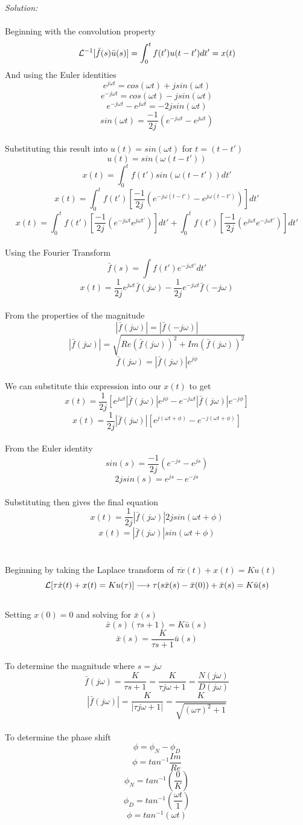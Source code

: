 \documentclass[10pt]{article}
\begin{document}
{\em Solution:}   
\\
\\
Beginning with the convolution property
\[{\cal L}^{-1}[{\bar f}(s){\bar u}(s)]= \int^t_0 f(t')u(t-t')dt' = x(t) \]
And using the Euler identities
\[e^{j \omega t}=cos(\omega t)+j sin(\omega t) \]
\[e^{-j \omega t}=cos(\omega t)-j sin(\omega t) \]
\[e^{-j \omega t}-e^{j \omega t}=-2jsin(\omega t) \]
\[sin(\omega t)=\frac{-1}{2j}(e^{-j\omega t}-e^{j \omega t}) \]
\\
Substituting this result into $u(t)=sin(\omega t)$ for $t=(t-t')$
\[u(t)=sin(\omega(t-t')) \]
\[x(t)=\int^t_0 f(t')sin(\omega(t-t')) dt' \]
\[x(t)=\int^t_0 f(t')\left[ \frac{-1}{2j}(e^{-j \omega(t-t')}-e^{j \omega (t-t')} ) \right] dt' \]
\[x(t)= 
\int^t_0 f(t')\left[ \frac{-1}{2j}(e^{-j \omega t}e^{j \omega t'} )\right]dt' + 
\int^t_0 f(t')\left[ \frac{-1}{2j}(e^{j \omega t}e^{-j \omega  t'} )\right]dt' \]
\\
Using the Fourier Transform
\[{\bar f}(s)=\int f(t')e^{-j \omega t'}dt' \]
\[x(t)=\frac{1}{2j}e^{j \omega t}{\bar f}(j \omega) - \frac{1}{2j}e^{-j \omega t}{\bar f}(-j \omega) \]
\\
From the properties of the magnitude
\[|{\bar f}(j \omega)|=|{\bar f}(-j \omega)| \]
\[|{\bar f}(j \omega)| = \sqrt{Re({\bar f}(j \omega))^2 + Im({\bar f}(j \omega))^2} \]
\[{\bar f}(j \omega)=|{\bar f}(j \omega)|e^{j \phi} \]
\\
We can substitute this expression into our $x(t)$ to get
\[x(t)=\frac{1}{2j}\left[ e^{j \omega t}|{\bar f}(j \omega)|e^{j \phi}-e^{-j \omega t} |{\bar f}(j \omega)|e^{-j \phi}  \right] \]
\[x(t)=\frac{1}{2j}|{\bar f}(j \omega)| \left[ e^{j(\omega t+\phi)}-e^{-j(\omega t+\phi)} \right] \]
\\
From the Euler identity 
\[sin(s)=\frac{-1}{2j}(e^{-js}-e^{js})\]
\[2jsin(s)=e^{js}-e^{-js} \]
\\
Substituting then gives the final equation
\[x(t)=\frac{1}{2j}|{\bar f}(j \omega)|2jsin(\omega t+\phi) \]
\[x(t)= |{\bar f}(j \omega)| sin(\omega t+\phi) \]
\\
\\
Beginning by taking the Laplace transform of $\tau {\dot x}(t)+x(t)=Ku(t)$
\[ {\cal L}[\tau {\dot x}(t)+x(t)=Ku(\tau)] \longrightarrow \tau(s {\bar x}(s)-{\bar x}(0))+{\bar x}(s)=K{\bar u}(s) \]
\\
Setting $x(0)=0$ and solving for ${\bar x}(s)$
\[{\bar x}(s)(\tau s+1)=K{\bar u}(s) \]
\[{\bar x}(s)=\frac{K}{\tau s+1} {\bar u}(s) \]
\\
To determine the magnitude where $s=j\omega$
\[{\bar f}(j \omega) = \frac{K}{\tau s+1} = \frac{K}{\tau j \omega+1} = \frac{N(j \omega)}{D(j \omega)} \]
\[|{\bar f}(j \omega)|= \frac{K}{|\tau j \omega+1|}= \frac{K}{\sqrt{(\omega \tau)^2+1}} \]
\\
To determine the phase shift
\[\phi = \phi_N- \phi_D \]
\[\phi=tan^{-1}\frac{Im}{Re} \]
\[\phi_N=tan^{-1}(\frac{0}{K}) \]
\[\phi_D=tan^{-1}(\frac{\omega t}{1}) \]
\[\phi=tan^{-1}(\omega t) \]


\newpage
\end{document}
